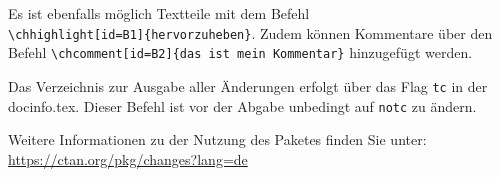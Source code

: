 Es ist ebenfalls möglich Textteile  mit dem Befehl \\ \lstinline|\chhighlight[id=B1]{hervorzuheben}|. Zudem können Kommentare über den Befehl \lstinline|\chcomment[id=B2]{das ist mein Kommentar}| hinzugefügt werden.


Das Verzeichnis zur Ausgabe aller Änderungen erfolgt über das Flag \lstinline|tc| in der docinfo.tex. Dieser Befehl ist vor der Abgabe unbedingt auf \lstinline|notc| zu ändern.

Weitere Informationen zu der Nutzung des Paketes finden Sie unter: \url{https://ctan.org/pkg/changes?lang=de}

\listofchanges[style=list, title=To Do's, show=all]







